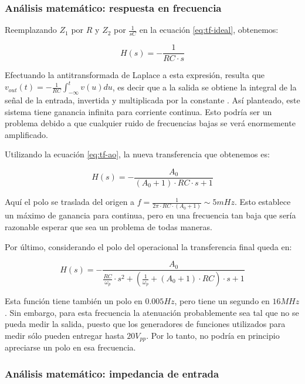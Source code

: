 \documentclass[../../main.tex]{subfiles}
\begin{document}
\subsubsection{An\'alisis matem\'atico: respuesta en frecuencia}

 Reemplazando $Z_1$ por $R$ y $Z_2$ por $\frac{1}{sC}$ en la ecuaci\'on \ref{eq:tf-ideal}, obtenemos:


\[ H(s) =  -\frac{1}{RC\cdot s}\]

Efectuando la antitransformada de Laplace a esta expresi\'on, resulta que $v_{out}(t) = -\frac{1}{RC} \int_{-\infty}^t v(u)du$, es decir que a la salida se obtiene la integral de la se\~nal de la entrada, invertida y multiplicada por la constante . As\'i planteado, este sistema tiene ganancia infinita para corriente continua. Esto podr\'ia ser un problema debido a que cualquier ruido de frecuencias bajas se ver\'a enormemente amplificado. \par

Utilizando la ecuaci\'on \ref{eq:tf-ao}, la nueva transferencia que obtenemos es:


\[ H(s) = -  \frac {A_0}{(A_0+1)\cdot RC \cdot s+1} \]

Aqu\'i el polo se traslada del origen a $f = \frac{1}{2\pi \cdot RC \cdot (A_0+1)} \sim 5mHz$. Esto establece un m\'aximo de ganancia para continua, pero en una frecuencia tan baja que ser\'ia razonable esperar que sea un problema de todas maneras. \par

Por \'ultimo, considerando el polo del operacional la transferencia final queda en:

\begin{equation}\label{eq:tf-int} H(s) = -\frac{A_0}{\frac{RC}{\omega_p} \cdot s^2 + \left(\frac{1}{\omega_p} + (A_0+1) \cdot RC\right) \cdot s +1} \end{equation}

Esta funci\'on tiene tambi\'en un polo en $0.005Hz$, pero tiene un segundo en $16MHz$. Sin embargo, para esta frecuencia la atenuaci\'on probablemente sea tal que no se pueda medir la salida, puesto que los generadores de funciones utilizados para medir s\'olo pueden entregar hasta $20V_{pp}$. Por lo tanto, no podr\'ia en principio apreciarse un polo en esa frecuencia.


\subsubsection{An\'alisis matem\'atico: impedancia de entrada}
\end{document}
